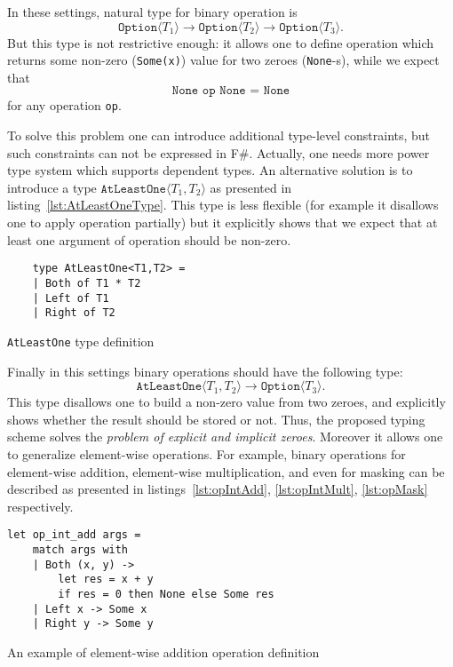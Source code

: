 In these settings, natural type for binary operation is $$\texttt{Option}\langle T_1 \rangle \to \texttt{Option}\langle T_2 \rangle \to \texttt{Option}\langle T_3 \rangle.$$ But this type is not restrictive enough: it allows one to define operation which returns some non-zero (\texttt{Some(x)}) value for two zeroes (\texttt{None}-s), while we expect that $$\texttt{None op None = None}$$ for any operation \texttt{op}.  

To solve this problem one can introduce additional type-level constraints, but such constraints can not be expressed in F\#.
Actually, one needs more power type system which supports dependent types.
An alternative solution is to introduce a type $\texttt{AtLeastOne} \langle T_1, T_2 \rangle$ as presented in listing~\ref{lst:AtLeastOneType}. This type is less flexible (for example it disallows one to apply operation partially) but it explicitly shows that we expect that at least one argument of operation should be non-zero.

\begin{listing}[h]
    \begin{verbatim}
    type AtLeastOne<T1,T2> =
    | Both of T1 * T2
    | Left of T1
    | Right of T2
    \end{verbatim}
    \caption{\texttt{AtLeastOne} type definition}
    \label{lst:AtLeastOneType}
\end{listing}

Finally in this settings binary operations should have the following type: $$\texttt{AtLeastOne} \langle T_1, T_2 \rangle \to \texttt{Option}\langle T_3 \rangle.$$
This type disallows one to build a non-zero value from two zeroes, and explicitly shows whether the result should be stored or not.
Thus, the proposed typing scheme solves the \textit{problem of explicit and implicit zeroes}.
Moreover it allows one to generalize element-wise operations.
For example, binary operations for element-wise addition, element-wise multiplication, and even for masking can be described as presented in listings~\ref{lst:opIntAdd}, \ref{lst:opIntMult}, \ref{lst:opMask} respectively.

\begin{listing}[h]
    \begin{verbatim}
let op_int_add args =
    match args with
    | Both (x, y) -> 
        let res = x + y 
        if res = 0 then None else Some res 
    | Left x -> Some x
    | Right y -> Some y
    \end{verbatim}
    \caption{An example of element-wise addition operation definition}
    \label{lst:opIntAdd}
\end{listing}

